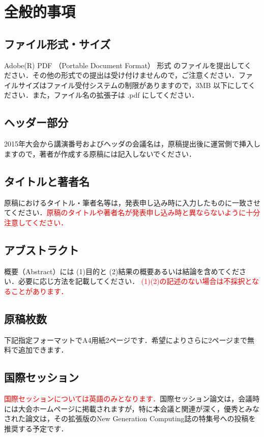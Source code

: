 \section{全般的事項}

\subsection{ファイル形式・サイズ}
Adobe(R) PDF （Portable Document Format） 形式 のファイルを提出してく
ださい．その他の形式での提出は受け付けませんので，ご注意ください．ファ
イルサイズはファイル受付システムの制限がありますので，3MB 以下にしてく
ださい．また，ファイル名の拡張子は .pdf にしてください．

\subsection{ヘッダー部分}
2015年大会から講演番号およびヘッダの会議名は，原稿提出後に運営側で挿入しますので，著者が作成する原稿には記入しないでください．

\subsection{タイトルと著者名}
原稿におけるタイトル・筆者名等は，発表申し込み時に入力したものに一致させてください．\textcolor{red}{原稿のタイトルや著者名が発表申し込み時と異ならないように十分注意してください．}

\subsection{アブストラクト}
概要（Abstract）には  (1)目的と (2)結果の概要あるいは結論を含めてください．必要に応じ方法を記載してください．
\textcolor{red}{(1)(2)の記述のない場合は不採択となることがあります．}

\subsection{原稿枚数}
下記指定フォーマットでA4用紙2ページです．希望によりさらに2ページまで無料で追加できます．

\subsection{国際セッション}
\textcolor{red}{国際セッションについては英語のみとなります．}国際セッション論文は，会議時には大会ホームページに掲載されますが，特に本会議と関連が深く，優秀とみなされた論文は，その拡張版のNew Generation Computing誌の特集号への投稿を推奨する予定です．


